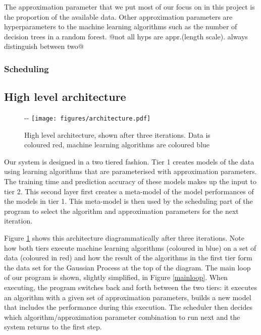 \documentclass[a4paper,12pt,twoside,openright]{report}
\begin{document}
The approximation parameter that we put most of our focus on in this project is the proportion of the available data. Other approximation parameters are hyperparameters to the machine learning algorithms such as the number of decision trees in a random forest. @not all hyps are appr.(length scale). always distinguish between two@

\subsubsection{Scheduling}


\subsection{High level architecture}
\begin{figure}[!ht]
  \begin{adjustwidth}{-\oddsidemargin-2in}{-\rightmargin-1.5in}
    \centering
    \texttt{[image: figures/architecture.pdf]}
    
  \end{adjustwidth}
  \caption{High level architecture, shown after three iterations. Data is coloured red, machine learning algorithms are coloured blue}
    \label{architecture}
\end{figure}

Our system is designed in a two tiered fashion. Tier 1 creates models of the data using learning algorithms that are parameterised with approximation parameters. The training time and prediction accuracy of these models makes up the input to tier 2. This second layer first creates a meta-model of the model performances of the models in tier 1. This meta-model is then used by the scheduling part of the program to select the algorithm and approximation parameters for the next iteration. 

Figure \ref{architecture} shows this architecture diagrammatically after three iterations. Note how both tiers execute machine learning algorithms (coloured in blue) on a set of data (coloured in red) and how the result of the algorithms in the first tier form the data set for the Gaussian Process at the top of the diagram. The main loop of our program is shown, slightly simplified, in Figure \ref{mainloop}. When executing, the program switches back and forth between the two tiers: it executes an algorithm with a given set of approximation parameters, builds a new model that includes the performance during this execution. The scheduler then decides which algorithm/approximation parameter combination to run next and the system returns to the first step.
\end{document}
